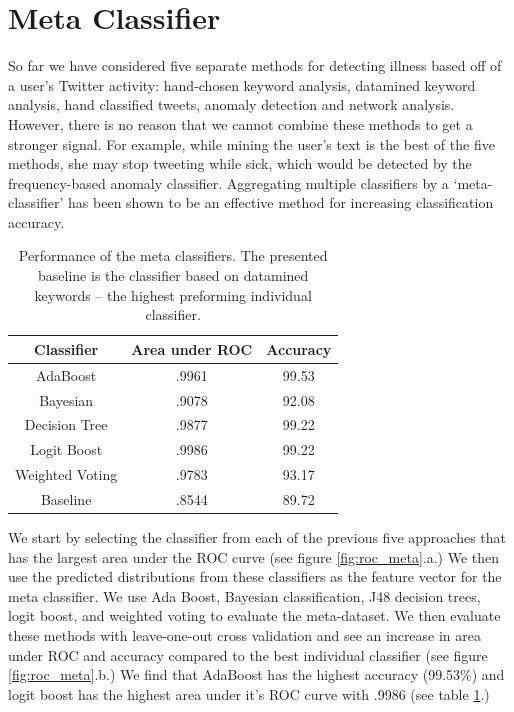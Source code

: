 \documentclass{acm_proc_article-sp}
\begin{document}
\section{Meta Classifier}

So far we have considered five separate methods for detecting illness based off of a user's Twitter activity: hand-chosen keyword analysis, datamined keyword analysis, hand classified tweets, anomaly detection and network analysis. However, there is no reason that we cannot combine these methods to get a stronger signal. For example, while mining the user's text is the best of the five methods, she may stop tweeting while sick, which would be detected by the frequency-based anomaly classifier. Aggregating multiple classifiers by a `meta-classifier' has been shown to be an effective method for increasing classification accuracy. \cite{Frossyniotis:2004wx,Todorovski:2003hk}

\begin{table}
\centering
\begin{tabular}{|c|c|c|} \hline
Classifier&Area under ROC& Accuracy \\ \hline
AdaBoost & .9961 & 99.53\\ \hline
Bayesian & .9078 &  92.08\\ \hline
Decision Tree & .9877 & 99.22\\ \hline
Logit Boost & .9986 & 99.22\\ \hline
Weighted Voting & .9783 & 93.17\\ \hline
Baseline & .8544 & 89.72\\ 
\hline\end{tabular}
\caption{Performance of the meta classifiers. The presented baseline is the classifier based on datamined keywords -- the highest preforming individual classifier.}
\label{tab:meta_results}
\end{table}

We start by selecting the classifier from each of the previous five approaches that has the largest area under the ROC curve (see figure \ref{fig:roc_meta}.a.) We then use the predicted distributions from these classifiers as the feature vector for the meta classifier. We use Ada Boost, Bayesian classification, J48 decision trees, logit boost, and weighted voting to evaluate the meta-dataset. We then evaluate these methods with leave-one-out cross validation and see an increase in area under ROC and accuracy compared to the best individual classifier (see figure \ref{fig:roc_meta}.b.) We find that AdaBoost has the highest accuracy (99.53\%) and logit boost has the highest area under it's ROC curve with .9986 (see table \ref{tab:meta_results}.)
\end{document}
